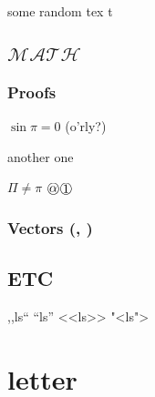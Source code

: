 \documentclass{trlnotes}
\begin{document}
some random tex t

\blinddocument

\section{$\mathcal{M\!AT\!H}$ \protect\underdev}

\subsection{Proofs}
\label{sub:proofs}


\begin{tproof}[kek?]
  $\sin\pi=0$ (o'rly?)
  \begin{lproof}[nested]
    another one
    \begin{pproof}
      $\Pi\neq\pi$
      {%
        \fboxsep=0pt
        \fbox{$\bigcirc$}\fbox{$\mathord{\Rightarrow}\vphantom{<}$}
      }%
      \circlearound{$\mathord{\Rightarrow}\vphantom{>}$}%
      $\circlearound{\alpha}\,\circlearound{1}$
    \end{pproof}
  \end{lproof}
\end{tproof}

\subsection{Vectors (\coori, \conori)}

\section{ETC}
,,ls`` "`ls"' <<ls>> "<ls">

\appendix
\chapter{letter}
\end{document}
